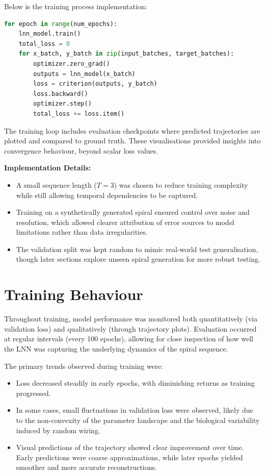 \vspace{1em}
\noindent Below is the training process implementation:
\begin{lstlisting}[language=Python, caption={Simplified training loop for the LNN}]
for epoch in range(num_epochs):
    lnn_model.train()
    total_loss = 0
    for x_batch, y_batch in zip(input_batches, target_batches):
        optimizer.zero_grad()
        outputs = lnn_model(x_batch)
        loss = criterion(outputs, y_batch)
        loss.backward()
        optimizer.step()
        total_loss += loss.item()
\end{lstlisting}

\vspace{0.5em}
\noindent The training loop includes evaluation checkpoints where predicted trajectories are plotted and compared to ground truth. These visualisations provided insights into convergence behaviour, beyond scalar loss values.

\vspace{1em}
\noindent \textbf{Implementation Details:}
\begin{itemize}
    \item A small sequence length ($T = 3$) was chosen to reduce training complexity while still allowing temporal dependencies to be captured.
    \item Training on a synthetically generated spiral ensured control over noise and resolution, which allowed clearer attribution of error sources to model limitations rather than data irregularities.
    \item The validation split was kept random to mimic real-world test generalisation, though later sections explore unseen spiral generation for more robust testing.
\end{itemize}

\section{Training Behaviour}
Throughout training, model performance was monitored both quantitatively (via validation loss) and qualitatively (through trajectory plots). Evaluation occurred at regular intervals (every 100 epochs), allowing for close inspection of how well the LNN was capturing the underlying dynamics of the spiral sequence.

\noindent The primary trends observed during training were:
\begin{itemize}
    \item Loss decreased steadily in early epochs, with diminishing returns as training progressed.
    \item In some cases, small fluctuations in validation loss were observed, likely due to the non-convexity of the parameter landscape and the biological variability induced by random wiring.
    \item Visual predictions of the trajectory showed clear improvement over time. Early predictions were coarse approximations, while later epochs yielded smoother and more accurate reconstructions.
\end{itemize}

